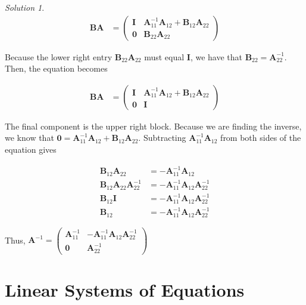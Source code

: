 \documentclass[
]{book}
\theoremstyle{definition}
\theoremstyle{definition}
\theoremstyle{definition}
\theoremstyle{definition}
\theoremstyle{remark}
\newtheorem*{solution}{Solution}
\begin{document}
\begin{solution}
\[
\begin{aligned}
\mathbf{B}\mathbf{A} & = \begin{pmatrix} \mathbf{I} & \mathbf{A}_{11}^{-1} \mathbf{A}_{12} + \mathbf{B}_{12} \mathbf{A}_{22} \\ \mathbf{0} & \mathbf{B}_{22} \mathbf{A}_{22}\end{pmatrix}
\end{aligned}
\]

Because the lower right entry \(\mathbf{B}_{22} \mathbf{A}_{22}\) must equal \(\mathbf{I}\), we have that \(\mathbf{B}_{22} = \mathbf{A}_{22}^{-1}\). Then, the equation becomes

\[
\begin{aligned}
\mathbf{B}\mathbf{A} & = \begin{pmatrix} \mathbf{I} & \mathbf{A}_{11}^{-1} \mathbf{A}_{12} + \mathbf{B}_{12} \mathbf{A}_{22} \\ \mathbf{0} & \mathbf{I} \end{pmatrix}
\end{aligned}
\]

The final component is the upper right block. Because we are finding the inverse, we know that \(\mathbf{0} = \mathbf{A}_{11}^{-1} \mathbf{A}_{12} + \mathbf{B}_{12} \mathbf{A}_{22}\). Subtracting \(\mathbf{A}_{11}^{-1} \mathbf{A}_{12}\) from both sides of the equation gives

\[
\begin{aligned}
\mathbf{B}_{12} \mathbf{A}_{22} & = - \mathbf{A}_{11}^{-1} \mathbf{A}_{12} \\
\mathbf{B}_{12} \mathbf{A}_{22} \mathbf{A}_{22}^{-1} & = - \mathbf{A}_{11}^{-1} \mathbf{A}_{12} \mathbf{A}_{22}^{-1}\\
\mathbf{B}_{12} \mathbf{I} & = - \mathbf{A}_{11}^{-1} \mathbf{A}_{12} \mathbf{A}_{22}^{-1}\\
\mathbf{B}_{12} & = - \mathbf{A}_{11}^{-1} \mathbf{A}_{12} \mathbf{A}_{22}^{-1}
\end{aligned}
\]

Thus, \(\mathbf{A}^{-1} = \begin{pmatrix} \mathbf{A}_{11}^{-1} & - \mathbf{A}_{11}^{-1} \mathbf{A}_{12} \mathbf{A}_{22}^{-1} \\ \mathbf{0} & \mathbf{A}_{22}^{-1} \end{pmatrix}\)
\end{solution}

\hypertarget{linear-systems-of-equations}{%
\chapter{Linear Systems of Equations}\label{linear-systems-of-equations}}
\end{document}

